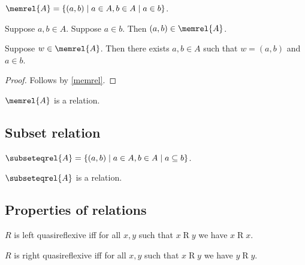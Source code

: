 \begin{definition}\label{memrel}
    $\memrel{A} = \{(a, b)\mid a\in A, b\in A \mid a\in b\}$.
\end{definition}

\begin{proposition}\label{memrel_elem_intro}
    Suppose $a, b\in A$.
    Suppose $a\in b$.
    Then $(a, b) \in\memrel{A}$.
\end{proposition}

\begin{proposition}\label{memrel_elem_inspect}
    Suppose $w\in\memrel{A}$.
    Then there exists $a, b\in A$ such that $w = (a, b)$ and $a\in b$.
\end{proposition}
\begin{proof}
    Follows by \cref{memrel}.
\end{proof}

\begin{proposition}\label{memrel_is_relation}
    $\memrel{A}$ is a relation.
\end{proposition}

\subsection{Subset relation}

\begin{definition}\label{subseteqrel}
    $\subseteqrel{A} = \{(a, b)\mid a\in A, b\in A \mid a\subseteq b\}$.
\end{definition}

\begin{proposition}\label{subseteqrel_is_relation}
    $\subseteqrel{A}$ is a relation.
\end{proposition}
\subsection{Properties of relations}

\begin{definition}\label{left_quasireflexive}
    $R$ is left quasireflexive iff
    for all $x, y$ such that $x\mathrel{R} y$
    we have $x\mathrel{R}x$.
\end{definition}

\begin{definition}\label{right_quasireflexive}
    $R$ is right quasireflexive iff
    for all $x, y$ such that $x\mathrel{R} y$
    we have $y\mathrel{R}y$.
\end{definition}

